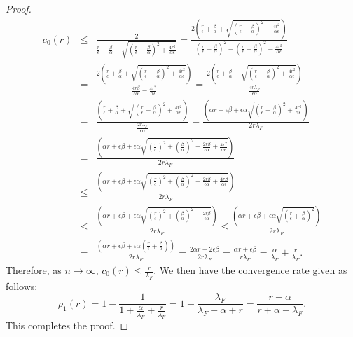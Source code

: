 \documentclass{article}
\theoremstyle{definition}
\begin{document}
\begin{proof}
\begin{eqnarray}
c_0(r) &\leq& \frac{2}{
\frac{r}{\epsilon} + \frac{\beta}{\alpha} - \sqrt{ \left ( \frac{r}{\epsilon} - \frac{\beta}{\alpha} \right )^2 + \frac{4r^2}{\alpha \epsilon}}} = \frac{2 \left ( \frac{r}{\epsilon} + \frac{\beta}{\alpha} + \sqrt{ \left ( \frac{r}{\epsilon} - \frac{\beta}{\alpha} \right )^2 + \frac{4r^2}{\alpha \epsilon}} \right ) }{
\left ( \frac{r}{\epsilon} + \frac{\beta}{\alpha} \right )^2 - \left ( \frac{r}{\epsilon} - \frac{\beta}{\alpha} \right )^2 - \frac{4r^2}{\alpha \epsilon}} \\
&=& \frac{2 \left ( \frac{r}{\epsilon} + \frac{\beta}{\alpha} + \sqrt{ \left ( \frac{r}{\epsilon} - \frac{\beta}{\alpha} \right )^2 + \frac{4r^2}{\alpha \epsilon}} \right ) }{
\frac{4r\beta}{\epsilon \alpha} - \frac{4r^2}{\alpha \epsilon}} = \frac{2 \left ( \frac{r}{\epsilon} + \frac{\beta}{\alpha} + \sqrt{ \left ( \frac{r}{\epsilon} - \frac{\beta}{\alpha} \right )^2 + \frac{4r^2}{\alpha \epsilon}} \right ) }{
\frac{4r\lambda_F}{\epsilon \alpha}} \\
&=& \frac{\left ( \frac{r}{\epsilon} + \frac{\beta}{\alpha} + \sqrt{ \left ( \frac{r}{\epsilon} - \frac{\beta}{\alpha} \right )^2 + \frac{4r^2}{\alpha \epsilon}} \right ) }{
\frac{2r\lambda_F}{\epsilon \alpha}} = \frac{\left ( \alpha r + \epsilon \beta  + \epsilon \alpha \sqrt{ \left ( \frac{r}{\epsilon} - \frac{\beta}{\alpha} \right )^2 + \frac{4r^2}{\alpha \epsilon}} \right ) }{2r\lambda_F}   \\
&=& \frac{\left ( \alpha r + \epsilon \beta  + \epsilon \alpha \sqrt{ \left ( \frac{r}{\epsilon} \right )^2 + \left( \frac{\beta}{\alpha} \right )^2 - \frac{2r\beta}{\epsilon \alpha} + \frac{4r^2}{\alpha \epsilon}} \right ) }{2r\lambda_F} \\ 
&\leq& \frac{\left ( \alpha r + \epsilon \beta  + \epsilon \alpha \sqrt{ \left ( \frac{r}{\epsilon} \right )^2 + \left( \frac{\beta}{\alpha} \right )^2 - \frac{2r\beta}{\epsilon \alpha} + \frac{4r\beta}{\alpha \epsilon}} \right ) }{2r\lambda_F} \\
&\leq& \frac{\left ( \alpha r + \epsilon \beta  + \epsilon \alpha \sqrt{ \left ( \frac{r}{\epsilon} \right )^2 + \left( \frac{\beta}{\alpha} \right )^2 + \frac{2r\beta}{\epsilon \alpha}} \right ) }{2r\lambda_F} \leq \frac{\left ( \alpha r + \epsilon \beta  + \epsilon \alpha \sqrt{ \left ( \frac{r}{\epsilon} + \frac{\beta}{\alpha} \right )^2} \right ) }{2r\lambda_F} \\
&=& \frac{\left ( \alpha r + \epsilon \beta  + \epsilon \alpha \left ( \frac{r}{\epsilon} + \frac{\beta}{\alpha} \right ) \right ) }{2r\lambda_F} = \frac{2\alpha r + 2\epsilon \beta}{2r\lambda_F} = \frac{\alpha r + \epsilon \beta}{r \lambda_F} = \frac{\alpha}{\lambda_F} + \frac{r}{\lambda_F}. 
\end{eqnarray}
Therefore, as $n \rightarrow \infty$, $c_0(r) \leq \frac{r}{\lambda_F}$. We then have the convergence rate given as follows:
\begin{equation}
\rho_1(r) = 1 - \frac{1}{1 + \frac{\alpha}{\lambda_F} + \frac{r}{\lambda_F}} = 1 - \frac{\lambda_F}{\lambda_F + \alpha + r} = \frac{r + \alpha}{r + \alpha + \lambda_F}. \end{equation}
This completes the proof. 
\end{proof} 
\end{document}
